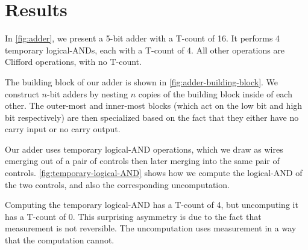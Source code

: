 \documentclass[twocolumn]{quantumarticle-customized}
\begin{document}
\section*{Results}

In \autoref{fig:adder}, we present a 5-bit adder with a T-count of 16.
It performs 4 temporary logical-ANDs, each with a T-count of 4.
All other operations are Clifford operations, with no T-count.

The building block of our adder is shown in \autoref{fig:adder-building-block}.
We construct $n$-bit adders by nesting $n$ copies of the building block inside of each other.
The outer-most and inner-most blocks (which act on the low bit and high bit respectively) are then specialized based on the fact that they either have no carry input or no carry output.

Our adder uses temporary logical-AND operations, which we draw as wires emerging out of a pair of controls then later merging into the same pair of controls.
\autoref{fig:temporary-logical-AND} shows how we compute the logical-AND of the two controls, and also the corresponding uncomputation.

Computing the temporary logical-AND has a T-count of 4, but uncomputing it has a T-count of 0.
This surprising asymmetry is due to the fact that measurement is not reversible.
The uncomputation uses measurement in a way that the computation cannot.
\end{document}

